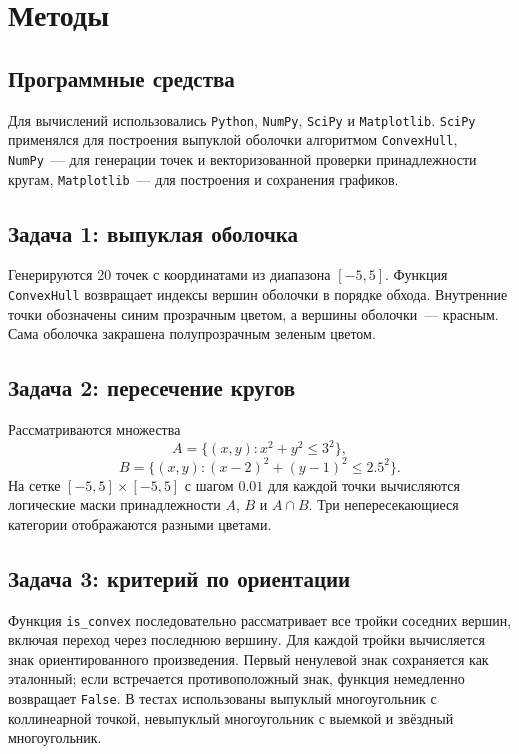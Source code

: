 \section{Методы}

\subsection{Программные средства}

Для вычислений использовались \texttt{Python}, \texttt{NumPy},
\texttt{SciPy} и \texttt{Matplotlib}. \texttt{SciPy} применялся для
построения выпуклой оболочки алгоритмом \texttt{ConvexHull},
\texttt{NumPy}~--- для генерации точек и векторизованной проверки
принадлежности кругам, \texttt{Matplotlib}~--- для построения и сохранения
графиков.

\newpage

\subsection{Задача 1: выпуклая оболочка}

Генерируются 20 точек с координатами из диапазона $[-5,5]$. Функция
\texttt{ConvexHull} возвращает индексы вершин оболочки в порядке
обхода. Внутренние точки обозначены синим прозрачным цветом, а вершины
оболочки~--- красным. Сама оболочка закрашена полупрозрачным
зеленым цветом.


\newpage

\subsection{Задача 2: пересечение кругов}

Рассматриваются множества
\[
	A=\{(x,y):x^2+y^2\leq 3^2\},
\]
\[
	B=\{(x,y):(x-2)^2+(y-1)^2\leq 2.5^2\}.
\]
На сетке $[-5,5]\times[-5,5]$ с шагом $0.01$ для каждой точки вычисляются логические маски принадлежности $A$, $B$ и $A\cap B$. Три непересекающиеся категории отображаются разными цветами.


\subsection{Задача 3: критерий по ориентации}

Функция \texttt{is\_convex} последовательно рассматривает все тройки соседних вершин, включая переход через последнюю вершину. Для каждой тройки вычисляется знак ориентированного произведения. Первый ненулевой знак сохраняется как эталонный; если встречается противоположный знак, функция немедленно возвращает \texttt{False}. В тестах использованы выпуклый многоугольник с коллинеарной точкой, невыпуклый многоугольник с выемкой и звёздный многоугольник.

